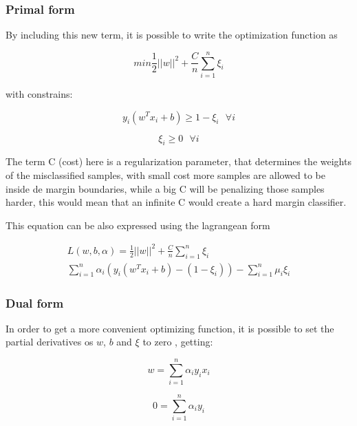\documentclass[11pt,twocolumn,letterpaper]{article}
\begin{document}
\subsubsection{Primal form}

By including this new term, it is possible to write the optimization function as

\begin{equation}
min \frac{1}{2}||w||^2 + \frac{C}{n} \sum^n_{i=1}\xi_i
\end{equation}

with constrains:

\begin{equation}
y_i(w^T x_i + b) \geq 1 - \xi_i \:\:\:\forall i
\end{equation}

\begin{equation}
	\xi_i  \geq 0 \:\:\: \forall i
\end{equation}

The term C (cost) here is a regularization parameter, that determines the weights of the misclassified samples, with small cost more samples are allowed to be inside de margin boundaries, while a big C will be penalizing those samples harder, this would mean that an infinite C would create a hard margin classifier.

This equation can be also expressed using the lagrangean form 

\begin{multline}
L(w,b,\alpha) = \frac{1}{2}||w||^2 +\frac{C}{n} \sum^n_{i=1}\xi_i \\ \sum_{i=1}^{n} \alpha_i (y_i(w^T x_i + b) - (1 - \xi_i)) - \sum^n_{i=1} \mu_i \xi_i
\end{multline}

\subsubsection{Dual form}

In order to get a more convenient optimizing function, it is possible to set the partial derivatives os $w$, $b$ and $\xi$ to zero \cite{Hastie2009}, getting:

\begin{equation}
	w = \sum_{i=1}^{n} \alpha_i y_i x_i
\end{equation}

\begin{equation}
	0 = \sum_{i=1}^{n} \alpha_i y_i
\end{equation}
\end{document}
